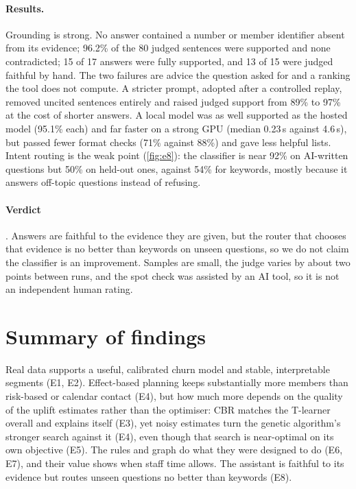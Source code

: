 \paragraph{Results.} Grounding is strong. No answer contained a number or member identifier absent from its evidence; 96.2\% of the 80 judged sentences were supported and none contradicted; 15 of 17 answers were fully supported, and 13 of 15 were judged faithful by hand. The two failures are advice the question asked for and a ranking the tool does not compute. A stricter prompt, adopted after a controlled replay, removed uncited sentences entirely and raised judged support from 89\% to 97\% at the cost of shorter answers. A local  model was as well supported as the hosted model (95.1\% each) and far faster on a strong GPU (median 0.23\,s against 4.6\,s), but passed fewer format checks (71\% against 88\%) and gave less helpful lists. Intent routing is the weak point (\cref{fig:e8}): the classifier is near 92\% on AI-written questions but 50\% on held-out ones, against 54\% for keywords, mostly because it answers off-topic questions instead of refusing.

\paragraph{Verdict} . Answers are faithful to the evidence they are given, but the router that chooses that evidence is no better than keywords on unseen questions, so we do not claim the classifier is an improvement. Samples are small, the judge varies by about two points between runs, and the spot check was assisted by an AI tool, so it is not an independent human rating.

\section{Summary of findings}

Real data supports a useful, calibrated churn model and stable, interpretable segments (E1, E2). Effect-based planning keeps substantially more members than risk-based or calendar contact (E4), but how much more depends on the quality of the uplift estimates rather than the optimiser: CBR matches the T-learner overall and explains itself (E3), yet noisy estimates turn the genetic algorithm's stronger search against it (E4), even though that search is near-optimal on its own objective (E5). The rules and graph do what they were designed to do (E6, E7), and their value shows when staff time allows. The assistant is faithful to its evidence but routes unseen questions no better than keywords (E8).
